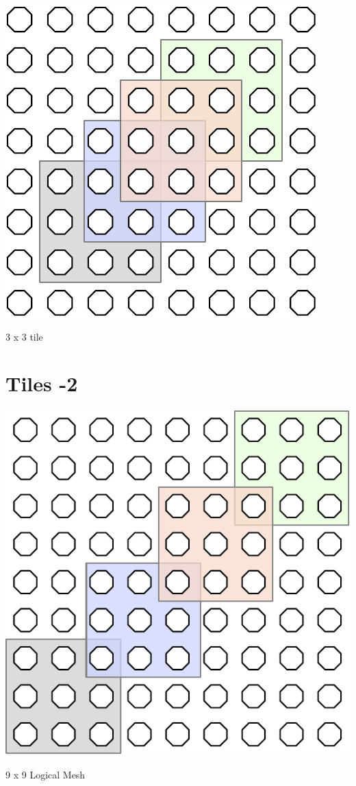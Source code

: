  \begin{marginfigure}
  \includegraphics[width=1.0\linewidth]{../../FIGURES/tensor-Tile-8x8.pdf}
   \caption{3 x 3 tile }
      \vspace{2em}
\end{marginfigure}

\section{Tiles -2 }

 \begin{marginfigure}
  \includegraphics[width=1.0\linewidth]{../../FIGURES/tensor-tile-9x9.pdf}
   \caption{9 x 9 Logical Mesh }
      \vspace{2em}
\end{marginfigure}

